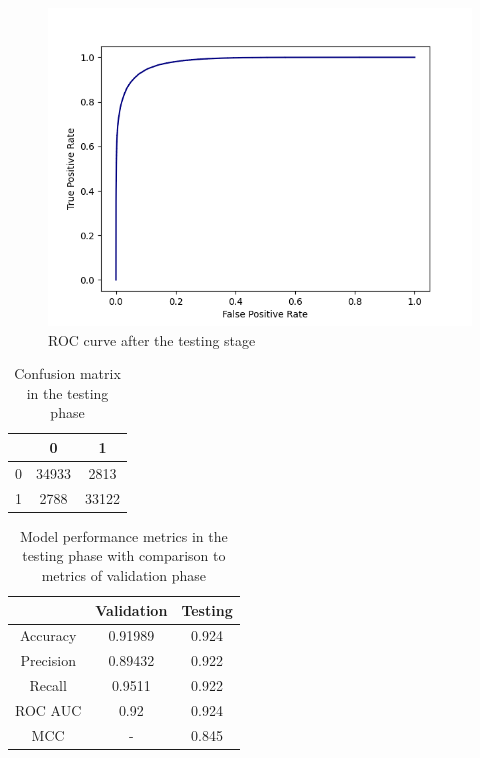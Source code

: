 \documentclass[12pt]{article}
\begin{document}
	\begin{figure}[h!]
		\centering
		\includegraphics[scale=0.7]{testing_0_3068.png}

		\caption{ ROC curve after the testing stage}
		\label{figure:SLP003testing}
	\end{figure}

	\begin{table}[h!]
		\caption{Confusion matrix in the testing phase}
		\vspace{0.2cm}
		\centering
		\begin{tabular}{ | c | c c | }
			\hline 
			& 0 & 1 \\
			\hline  
			0 & 34933 & 2813 \\
			1 & 2788 & 33122 \\
			\hline    
		\end{tabular}
		\label{table:SLP003confusionMatrixTesting}
	\end{table}

	\begin{table}[h!]
		\caption{Model performance metrics in the testing phase 
		with comparison to metrics of validation phase}
		\vspace{0.2cm}
		\centering
		\begin{tabular}{ | c c c | }
			\hline 
			& Validation & Testing \\
			\hline
			Accuracy & 0.91989 & 0.924 \\
			Precision & 0.89432 & 0.922 \\
			Recall & 0.9511 & 0.922 \\
			ROC AUC & 0.92 & 0.924 \\
			MCC & - & 0.845 \\
			\hline 
		\end{tabular}
		\label{table:SLP003metricsTesting}
	\end{table}
\end{document}
